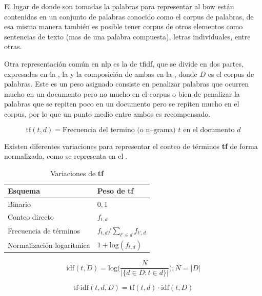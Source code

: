 El lugar de donde son tomadas la palabras para representar al \gls{bow} están contenidas en un conjunto de palabras conocido como el \gls{corpus} de palabras, de esa misma manera también es posible tener \gls{corpus} de otros elementos como sentencias de texto (mas de una palabra compuesta), letras individuales, entre otras.

Otra representación común en \gls{nlp} es la de \gls{tfidf}, que se divide en dos partes, expresadas en la , la  y la composición de ambas en la , donde $D$ es el \gls{corpus} de palabras. Este es un peso asignado consiste en penalizar palabras que ocurren mucho en un documento pero no mucho en el \gls{corpus} o bien de penalizar la palabras que se repiten poco en un documento pero se repiten mucho en el \gls{corpus}, por lo que un punto medio entre ambos es recompensado.

\begin{equation} \label{eq:tf-repr}
  \text{tf}(t,d) = \text{Frecuencia del termino (o n--grama) } t \text{ en el documento } d
\end{equation}

Existen diferentes variaciones para representar el conteo de términos \textbf{tf} de forma normalizada, como se representa en el .

\begin{table}[h!]
\centering
\begin{tabular}{|l|l|} \hline
  \textbf{Esquema}          & \textbf{Peso de tf} \\ \hline
  Binario                   & $0, 1$ \\ \hline
  Conteo directo            & $f_{t, d}$ \\ \hline
  Frecuencia de términos    & $f_{t, d} / \sum_{t' \in d}f_{t', d}$ \\ \hline
  Normalización logarítmica & $1 + \text{log}(f_{t, d})$ \\ \hline
\end{tabular}
\caption{Variaciones de \textbf{tf}}
\label{table:tf}
\end{table}

\begin{equation} \label{eq:idf-repr}
  \text{idf}(t, D) = \text{log}\Bigg( \frac{N}{|\{d \in D : t \in d\}|} \Bigg) ; N = |D|
\end{equation}

\begin{equation} \label{eq:tfidf-repr}
  \text{tf-idf}(t, d, D) = \text{tf}(t, d) \cdot \text{idf}(t, D)
\end{equation}

